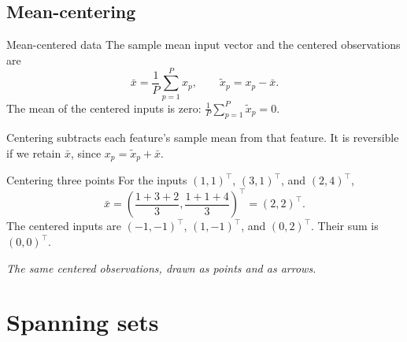\documentclass[a4paper,12pt,oneside]{report}
\begin{document}
\subsection{Mean-centering}

\begin{frameddefn}{Mean-centered data}\label{def:mean-centering}
The sample mean input vector and the centered observations are
\[
  \bar{x}=\frac{1}{P}\sum_{p=1}^{P}x_p,
  \qquad
  \widetilde{x}_p=x_p-\bar{x}.
\]
The mean of the centered inputs is zero:
$\frac{1}{P}\sum_{p=1}^{P}\widetilde{x}_p=0$.
\end{frameddefn}

Centering subtracts each feature's sample mean from that feature. It is
reversible if we retain $\bar{x}$, since
$x_p=\widetilde{x}_p+\bar{x}$.

\begin{framedexample}{Centering three points}
For the inputs $(1,1)^\top$, $(3,1)^\top$, and $(2,4)^\top$,
\[
  \bar{x}=\left(\frac{1+3+2}{3},\frac{1+1+4}{3}\right)^\top
         =(2,2)^\top.
\]
The centered inputs are $(-1,-1)^\top$, $(1,-1)^\top$, and
$(0,2)^\top$. Their sum is $(0,0)^\top$.
\end{framedexample}

\begin{center}
\par\smallskip
{\small\textit{The same centered observations, drawn as points and as arrows.}}
\end{center}

\clearpage
\section{Spanning sets}
\end{document}
